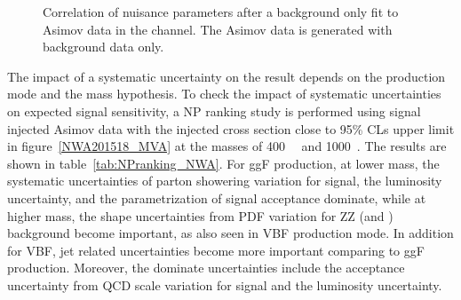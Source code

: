 \begin{figure}[!ht]
\begin{center}
\caption{Correlation of nuisance parameters after a background only fit to Asimov data in the \llll channel.
The Asimov data is generated with background data only.
}
\label{fig:NPcorr_cb_asimov}
\end{center}
\end{figure}

The impact of a systematic uncertainty on the result depends on the production mode and the mass hypothesis.
To check the impact of systematic uncertainties on expected signal sensitivity, a NP ranking study is performed using
signal injected Asimov data with the injected cross section close to 95\% CLs upper limit in figure~\ref{NWA201518_MVA} at the masses of 400~\gev~ and 1000~\gev.
The results are shown in table~\ref{tab:NPranking_NWA}.
For ggF production, at lower mass, the systematic uncertainties of parton showering variation for signal, the luminosity uncertainty, 
and the parametrization of signal acceptance dominate,
while at higher mass, the shape uncertainties from PDF variation for ZZ (\qqZZ and \ggZZ) background become important, as also seen in VBF production mode.
In addition for VBF, jet related uncertainties become more important comparing to ggF production.
Moreover, the dominate uncertainties include the acceptance uncertainty from QCD scale variation for signal and the luminosity uncertainty.


